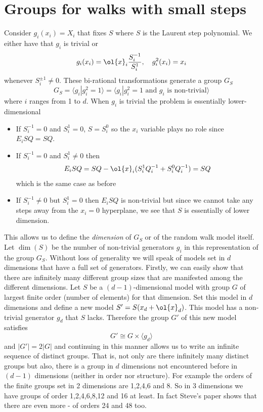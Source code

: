 

\chapter{Groups for walks with small steps}

Consider $g_i(x_i) = X_i$ that fixes $S$ where $S$ is the Laurent step polynomial. We either have that $g_i$ is trivial or
\[
	g_i(x_i) = \ol{x}_i\frac{S_i^{-1}}{S_i^1},\quad g_i^2(x_i) = x_i
\]
whenever $S_i^{\pm 1} \neq 0$. These bi-rational transformations generate a group $G_S$
\[
	G_S = \langle g_i | g_i^2 = 1\rangle = \langle g_i | g_i^2 = 1\text{ and } g_i \text{ is non-trivial}\rangle
\]
where $i$ ranges from 1 to $d$. When $g_i$ is trivial the problem is essentially lower-dimensional
\begin{itemize}
\item[1)] If $S_i^{-1} = 0$ and $S_i^{1} = 0$, $S = S_i^0$ so the $x_i$ variable plays no role since $E_i S Q= SQ$.
\item[2)] If $S_i^{-1} = 0$ and $S_i^1 \neq 0$ then
\[
	E_i SQ = SQ - \ol{x}_i(S_i^{1}Q_i^{-1}+S_i^0 Q_i^{-1}) = SQ
\]
which is the same case as before
\item[3)] If $S_i^{-1}\neq 0$ but $S_i^{1} = 0$ then $E_iSQ$ is non-trivial but since we cannot take any steps away from the $x_i = 0$ hyperplane, we see that $S$ is essentially of lower dimension.
\end{itemize}
This allows us to define the \emph{dimension} of $G_S$ or of the random walk model itself. Let $\dim(S)$ be the number of non-trivial generators $g_i$ in this representation of the group $G_S$. Without loss of generality we will speak of models set in $d$ dimensions that have a full set of generators. Firstly, we can easily show that there are infinitely many different group sizes that are manifested among the different dimensions. Let $S$ be a $(d-1)$-dimensional model with group $G$ of largest finite order (number of elements) for that dimension. Set this model in $d$ dimensions and define a new model $S' = S(x_d+\ol{x}_d)$. This model has a non-trivial generator $g_d$ that $S$ lacks. Therefore the group $G'$ of this new model satisfies
\[
	G' \cong G \times \langle g_d \rangle
\]
and $|G'| = 2|G|$ and continuing in this manner allows us to write an infinite sequence of distinct groups. That is, not only are there infinitely many distinct groups but also, there is a group in $d$ dimensions not encountered before in $(d-1)$ dimensions (neither in order nor structure). For example the orders of the finite groups set in 2 dimensions are 1,2,4,6 and 8. So in 3 dimensions we have groups of order 1,2,4,6,8,12 and 16 at least. In fact Steve's paper shows that there are even more - of orders 24 and 48 too.

